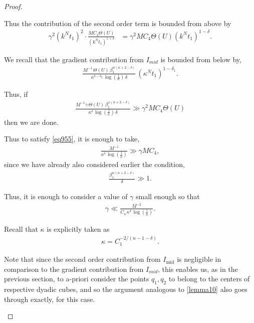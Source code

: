 \documentclass{article}
\newcounter{lem}
\theoremstyle{plain}
\theoremstyle{plain}
\newcommand{\thee}{\Theta(U)}
\theoremstyle{definition}
\theoremstyle{plain}
\begin{document}
\begin{proof}
\begin{itemize}
Thus the contribution of the second order term is bounded from above by
\begin{align}
\gamma^2 (k^N t_1)^2 \cdot \frac{M C_4 \thee}{(k^N t_1)^{1+\delta}}
&= \gamma^2 M C_4 \thee (k^N t_1)^{1-\delta}.
\end{align}

We recall that the gradient contribution from $I_{mid}$  is bounded from below by,
\begin{align}
\frac{M^{-1}\,\thee\,\beta_1^{w(n+2-\delta)}}{\kappa^{\delta-\delta_2}\,\log\!\left(\tfrac{1}{\kappa}\right)\,\delta}
\,( \kappa^{N} t_1 )^{1-\delta_1}.
\end{align}


Thus, if
\begin{align}\label{eq955}
\frac{M^{-1}\gamma \,\thee\,\beta_1^{\omega(n+2-\delta)}}{\kappa^{\delta}\,\log\!\left(\tfrac{1}{\kappa}\right)\,\delta}
\gg \gamma^{2} M C_4 \thee
\end{align}
then we are done.

Thus to satisfy \cref{eq955}, it is enough to take,
\begin{align}
\frac{M^{-1}}{\kappa^{\delta}\,\log\!\left(\tfrac{1}{\kappa}\right)}
\gg \gamma M C_4,
\end{align}
since we have already also considered earlier the condition,
\begin{align}
\frac{\beta_1^{w(n+2-\delta)}}{\delta} \gg 1.
\end{align}

Thus, it is enough to consider a value of $\gamma$ small enough
so that
\begin{align}\label{eq97}
\gamma \ll \frac{M^{-2}}{C_4\,\kappa^{\delta}\,\log\!\left(\tfrac{1}{\kappa}\right)}.
\end{align}

Recall that $\kappa$ is explicitly taken as
\begin{align}
\kappa = C_1^{-2/(n-1-\delta)}.
\end{align}

Note that since the second order contribution from $I_{\text{mid}}$ is negligible in comparison to the gradient contribution from $I_{mid}$, this enables us, as in the previous section, to a-priori consider the points $q_1,q_2$ to belong to the centers of respective dyadic cubes, and so the argument analogous to \cref{lemma10} also goes through exactly, for this case.


\end{itemize}
\end{proof}
\end{document}
